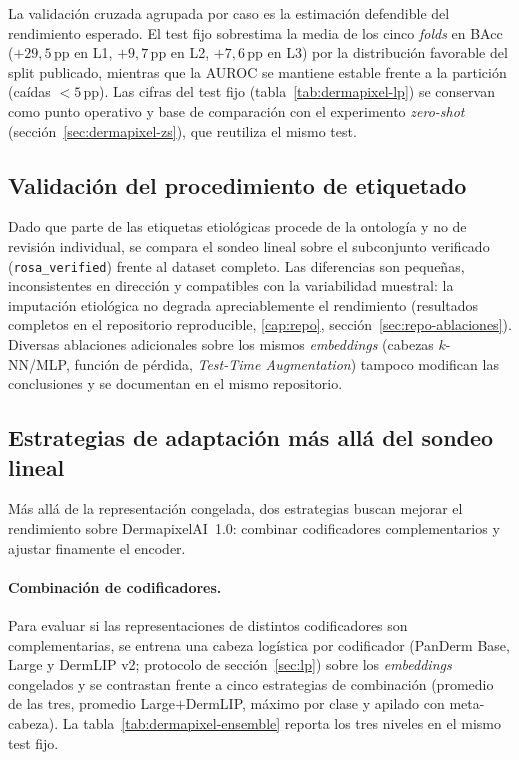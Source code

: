 La validación cruzada agrupada por caso es la estimación defendible
del rendimiento esperado. El test fijo sobrestima la media de los
cinco \emph{folds} en BAcc ($+29{,}5$\,pp en L1, $+9{,}7$\,pp en L2,
$+7{,}6$\,pp en L3) por la distribución favorable del split publicado,
mientras que la AUROC se mantiene estable frente a la partición (caídas
$<5$\,pp). Las cifras del test fijo (tabla~\ref{tab:dermapixel-lp}) se
conservan como punto operativo y base de comparación con el experimento
\emph{zero-shot} (sección~\ref{sec:dermapixel-zs}), que reutiliza el
mismo test.


\subsection{Validación del procedimiento de etiquetado}

Dado que parte de las etiquetas etiológicas procede de la ontología y
no de revisión individual, se compara el sondeo lineal sobre el
subconjunto verificado (\texttt{rosa\_verified}) frente al dataset
completo. Las diferencias son pequeñas, inconsistentes en dirección y
compatibles con la variabilidad muestral: la imputación etiológica no
degrada apreciablemente el rendimiento (resultados completos en el
repositorio reproducible, \ref{cap:repo}, sección~\ref{sec:repo-ablaciones}). Diversas
ablaciones adicionales sobre los mismos \emph{embeddings} (cabezas
$k$-NN/MLP, función de pérdida, \emph{Test-Time Augmentation}) tampoco
modifican las conclusiones y se documentan en el mismo repositorio.


\subsection{Estrategias de adaptación más allá del sondeo lineal}
\label{sec:dermapixel-ensemble}

Más allá de la representación congelada, dos estrategias buscan mejorar
el rendimiento sobre DermapixelAI~1.0: combinar codificadores
complementarios y ajustar finamente el encoder.

\paragraph{Combinación de codificadores.}
Para evaluar si las representaciones de distintos codificadores son
complementarias, se entrena una cabeza logística por codificador
(PanDerm Base, Large y DermLIP v2; protocolo de sección~\ref{sec:lp})
sobre los \emph{embeddings} congelados y se contrastan frente a cinco
estrategias de combinación (promedio de las tres, promedio
Large$+$DermLIP, máximo por clase y apilado con meta-cabeza). La
tabla~\ref{tab:dermapixel-ensemble} reporta los tres niveles en el
mismo test fijo.

